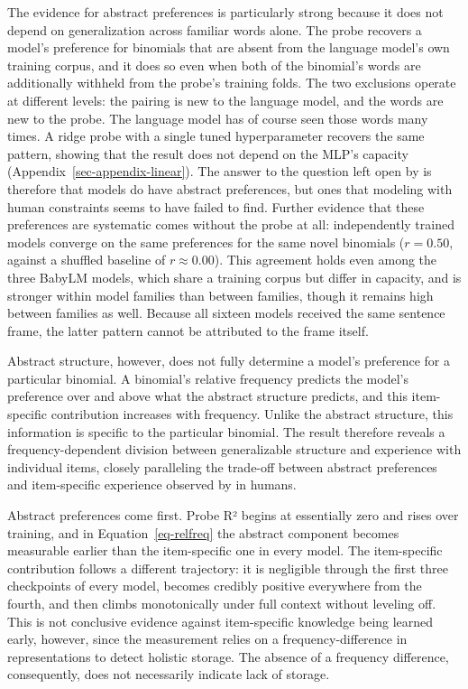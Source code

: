 \documentclass[11pt]{article}
\begin{document}
The evidence for abstract preferences is particularly strong because it
does not depend on generalization across familiar words alone. The probe
recovers a model's preference for binomials that are absent from the
language model's own training corpus, and it does so even when both of
the binomial's words are additionally withheld from the probe's training
folds. The two exclusions operate at different levels: the pairing is
new to the language model, and the words are new to the probe. The
language model has of course seen those words many times. A ridge probe
with a single tuned hyperparameter recovers the same pattern, showing
that the result does not depend on the MLP's capacity
(Appendix~\ref{sec-appendix-linear}). The answer to the question left
open by \citet{houghton2025role} is therefore that models do have
abstract preferences, but ones that modeling with human constraints
seems to have failed to find. Further evidence that these preferences
are systematic comes without the probe at all: independently trained
models converge on the same preferences for the same novel binomials
(\(r = 0.50\), against a shuffled baseline of \(r \approx 0.00\)). This
agreement holds even among the three BabyLM models, which share a
training corpus but differ in capacity, and is stronger within model
families than between families, though it remains high between families
as well. Because all sixteen models received the same sentence frame,
the latter pattern cannot be attributed to the frame itself.

Abstract structure, however, does not fully determine a model's
preference for a particular binomial. A binomial's relative frequency
predicts the model's preference over and above what the abstract
structure predicts, and this item-specific contribution increases with
frequency. Unlike the abstract structure, this information is specific
to the particular binomial. The result therefore reveals a
frequency-dependent division between generalizable structure and
experience with individual items, closely paralleling the trade-off
between abstract preferences and item-specific experience observed by
\citet{morgan2016} in humans.

Abstract preferences come first. Probe R² begins at essentially zero and
rises over training, and in Equation~\ref{eq-relfreq} the abstract
component becomes measurable earlier than the item-specific one in every
model. The item-specific contribution follows a different trajectory: it
is negligible through the first three checkpoints of every model,
becomes credibly positive everywhere from the fourth, and then climbs
monotonically under full context without leveling off. This is not
conclusive evidence against item-specific knowledge being learned early,
however, since the measurement relies on a frequency-difference in
representations to detect holistic storage. The absence of a frequency
difference, consequently, does not necessarily indicate lack of storage.
\end{document}
